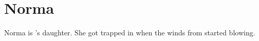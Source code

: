 \section{Norma}
\label{char:norma}


Norma is ’s daughter. She got trapped in  when the winds from  started blowing.

